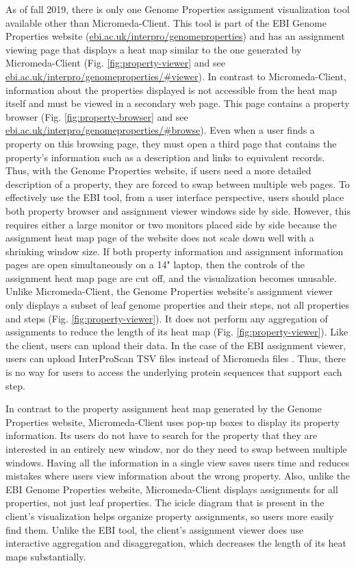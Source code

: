 As of fall 2019, there is only one Genome Properties assignment visualization tool available other than Micromeda-Client. This tool is part of the EBI Genome Properties website \cite{richardson2018genome} (\href{ebi.ac.uk/interpro/genomeproperties}{ebi.ac.uk/interpro/genomeproperties}) and has an assignment viewing page that displays a heat map similar to the one generated by Micromeda-Client \cite{richardson2018genome}  (Fig. \ref{fig:property-viewer} and see \href{ebi.ac.uk/interpro/genomeproperties/\#viewer}{ebi.ac.uk/interpro/genomeproperties/\#viewer}). In contrast to Micromeda-Client, information about the properties displayed is not accessible from the heat map itself and must be viewed in a secondary web page. This page contains a property browser (Fig. \ref{fig:property-browser} and see \href{ebi.ac.uk/interpro/genomeproperties/\#browse}{ebi.ac.uk/interpro/genomeproperties/\#browse}). Even when a user finds a property on this browsing page, they must open a third page that contains the property's information such as a description and links to equivalent records. Thus, with the Genome Properties website, if users need a more detailed description of a property, they are forced to swap between multiple web pages. To effectively use the EBI tool, from a user interface perspective, users should place both property browser and assignment viewer windows side by side. However, this requires either a large monitor or two monitors placed side by side because the assignment heat map page of the website does not scale down well with a shrinking window size. If both property information and assignment information pages are open simultaneously on a 14" laptop, then the controls of the assignment heat map page are cut off, and the visualization becomes unusable. Unlike Micromeda-Client, the Genome Properties website's assignment viewer only displays a subset of leaf genome properties and their steps, not all properties and steps (Fig. \ref{fig:property-viewer}). It does not perform any aggregation of assignments to reduce the length of its heat map (Fig. \ref{fig:property-viewer}). Like the client, users can upload their data. In the case of the EBI assignment viewer, users can upload InterProScan TSV files instead of Micromeda files \cite{richardson2018genome}. Thus, there is no way for users to access the underlying protein sequences that support each step.

In contrast to the property assignment heat map generated by the Genome Properties website, Micromeda-Client uses pop-up boxes to display its property information. Its users do not have to search for the property that they are interested in an entirely new window, nor do they need to swap between multiple windows. Having all the information in a single view saves users time and reduces mistakes where users view information about the wrong property. Also, unlike the EBI Genome Properties website, Micromeda-Client displays assignments for all properties, not just leaf properties. The icicle diagram that is present in the client's visualization helps organize property assignments, so users more easily find them. Unlike the EBI tool, the client's assignment viewer does use interactive aggregation and disaggregation, which decreases the length of its heat maps substantially.

